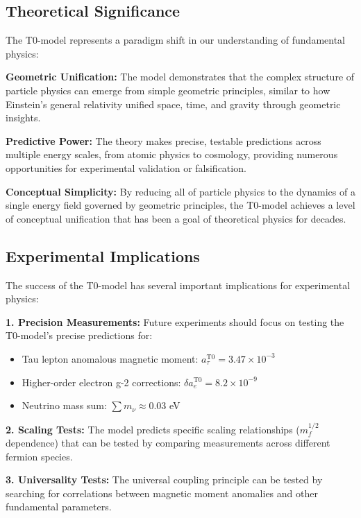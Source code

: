 \documentclass[12pt,a4paper]{article}
\begin{document}
	\subsection{Theoretical Significance}
	
	The T0-model represents a paradigm shift in our understanding of fundamental physics:
	
	\textbf{Geometric Unification:}
	The model demonstrates that the complex structure of particle physics can emerge from simple geometric principles, similar to how Einstein's general relativity unified space, time, and gravity through geometric insights.
	
	\textbf{Predictive Power:}
	The theory makes precise, testable predictions across multiple energy scales, from atomic physics to cosmology, providing numerous opportunities for experimental validation or falsification.
	
	\textbf{Conceptual Simplicity:}
	By reducing all of particle physics to the dynamics of a single energy field governed by geometric principles, the T0-model achieves a level of conceptual unification that has been a goal of theoretical physics for decades.
	
	\subsection{Experimental Implications}
	
	The success of the T0-model has several important implications for experimental physics:
	
	\textbf{1. Precision Measurements:}
	Future experiments should focus on testing the T0-model's precise predictions for:
	\begin{itemize}
		\item Tau lepton anomalous magnetic moment: $a_\tau^{\text{T0}} = 3.47 \times 10^{-3}$
		\item Higher-order electron g-2 corrections: $\delta a_e^{\text{T0}} = 8.2 \times 10^{-9}$
		\item Neutrino mass sum: $\sum m_\nu \approx 0.03$ eV
	\end{itemize}
	
	\textbf{2. Scaling Tests:}
	The model predicts specific scaling relationships ($m_f^{1/2}$ dependence) that can be tested by comparing measurements across different fermion species.
	
	\textbf{3. Universality Tests:}
	The universal coupling principle can be tested by searching for correlations between magnetic moment anomalies and other fundamental parameters.
	
\end{document}
